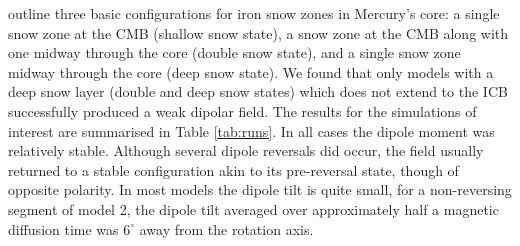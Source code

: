 \citet{chenetal2008} outline three basic configurations for iron snow zones in Mercury's core: a single snow zone at the CMB (shallow snow state), a snow zone at the CMB along with one midway through the core (double snow state), and a single snow zone midway through the core (deep snow state). We found that only models with a deep snow layer (double and deep snow states)  which does not extend to the ICB successfully produced a weak dipolar field.  The results for the simulations of interest are summarised in Table \ref{tab:runs}. In all cases the dipole moment was relatively stable. Although several dipole reversals did occur, the field usually returned to a stable configuration akin to its pre-reversal state, though of opposite polarity. In most models the dipole tilt is quite small, for a non-reversing segment of model 2, the dipole tilt averaged over approximately half a magnetic diffusion time was $6^{\circ}$ away from the rotation axis.
